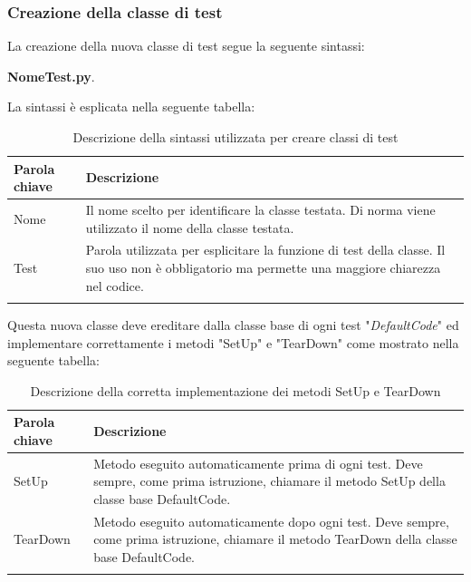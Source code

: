 \subsubsection{Creazione della classe di test}
La creazione della nuova classe di test segue la seguente sintassi: \newline{} \centerline{\textbf{NomeTest.py}.} La sintassi è esplicata nella seguente tabella:
{
	\setlength{\freewidth}{\dimexpr\textwidth-1\tabcolsep}
	\renewcommand{\arraystretch}{1.5}
	\setlength{\aboverulesep}{0pt}
	\setlength{\belowrulesep}{0pt}
	\begin{longtable}{L{.15\freewidth} L{.85\freewidth}}
		\textbf{Parola chiave} & \textbf{Descrizione}\\
		\toprule
		\endhead	
		Nome & Il nome scelto per identificare la classe testata. Di norma viene utilizzato il nome della classe testata.\\
		Test & Parola utilizzata per esplicitare la funzione di test della classe. Il suo uso non è obbligatorio ma permette una maggiore chiarezza nel codice. \\
		\bottomrule
		\hiderowcolors
		\caption{Descrizione della sintassi utilizzata per creare classi di test}
	\end{longtable}
}
Questa nuova classe deve ereditare dalla classe base di ogni test "\textit{DefaultCode}" ed implementare correttamente i metodi "SetUp" e "TearDown" come mostrato nella seguente tabella:
{
	\setlength{\freewidth}{\dimexpr\textwidth-1\tabcolsep}
	\renewcommand{\arraystretch}{1.5}
	\setlength{\aboverulesep}{0pt}
	\setlength{\belowrulesep}{0pt}
	\begin{longtable}{L{.15\freewidth} L{.85\freewidth}}
		\textbf{Parola chiave} & \textbf{Descrizione}\\
		\toprule
		\endhead	
		SetUp & Metodo eseguito automaticamente prima di ogni test. Deve sempre, come prima istruzione, chiamare il metodo SetUp della classe base DefaultCode.\\
		TearDown & Metodo eseguito automaticamente dopo ogni test. Deve sempre, come prima istruzione, chiamare il metodo TearDown della classe base DefaultCode.\\
		\bottomrule
		\hiderowcolors
		\caption{Descrizione della corretta implementazione dei metodi SetUp e TearDown}
	\end{longtable}
}

